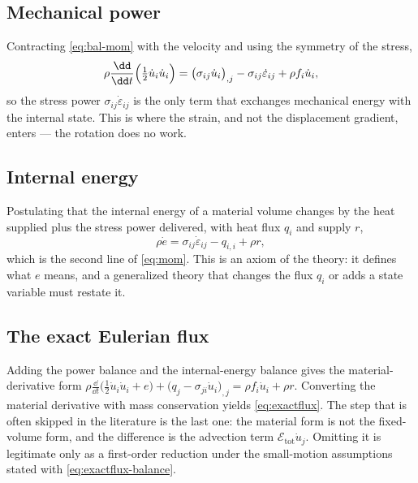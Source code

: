 \subsection*{Mechanical power}\label{eq:bal-power}
Contracting \eqref{eq:bal-mom} with the velocity and using the symmetry of the stress,
\begin{equation}
\rho\frac{\dd}{\dd t}\Bigl(\tfrac12\dot u_i\dot u_i\Bigr)=\bigl(\sigma_{ij}\dot u_i\bigr)_{,j}
-\sigma_{ij}\dot\varepsilon_{ij}+\rho f_i\dot u_i ,
\end{equation}
so the stress power $\sigma_{ij}\dot\varepsilon_{ij}$ is the only term that exchanges mechanical energy with
the internal state. This is where the strain, and not the displacement gradient, enters --- the rotation
does no work.

\subsection*{Internal energy}\label{eq:bal-energy}
Postulating that the internal energy of a material volume changes by the heat supplied plus the stress power
delivered, with heat flux $q_i$ and supply $r$,
\begin{equation}
\rho\dot e=\sigma_{ij}\dot\varepsilon_{ij}-q_{i,i}+\rho r ,
\end{equation}
which is the second line of \eqref{eq:mom}. This is an axiom of the theory: it defines what $e$ means, and
a generalized theory that changes the flux $q_i$ or adds a state variable must restate it.

\subsection*{The exact Eulerian flux}
Adding the power balance and the internal-energy balance gives the material-derivative form
$\rho\frac{\dd}{\dd t}\bigl(\tfrac12\dot u_i\dot u_i+e\bigr)+\bigl(q_j-\sigma_{ji}\dot u_i\bigr)_{,j}
=\rho f_i\dot u_i+\rho r$. Converting the material derivative with mass conservation yields
\eqref{eq:exactflux}. The step that is often skipped in the literature is the last one: the material form
is not the fixed-volume form, and the difference is the advection term $\mathcal E_{\mathrm{tot}}\dot u_j$.
Omitting it is legitimate only as a first-order reduction under the small-motion assumptions stated with
\eqref{eq:exactflux-balance}.
